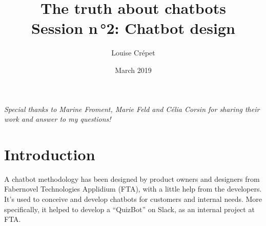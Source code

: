 \documentclass{article}
\title{The truth about chatbots \\[0.4em]\smaller{}Session n\,°2: Chatbot design}
\author{Louise Crépet}
\date{March 2019}
\begin{document}
\maketitle

\textit{Special thanks to Marine Froment, Marie Feld and Célia Corsin for sharing their work and answer to my questions!}

\newpage
\section{Introduction}
A chatbot methodology has been designed by product owners and designers from Fabernovel Technologies Applidium (FTA), with a little help from the developers. It’s used to conceive and develop chatbots for customers and internal needs.
More specifically, it helped to develop a “QuizBot” on Slack, as an internal project at FTA.
\end{document}
